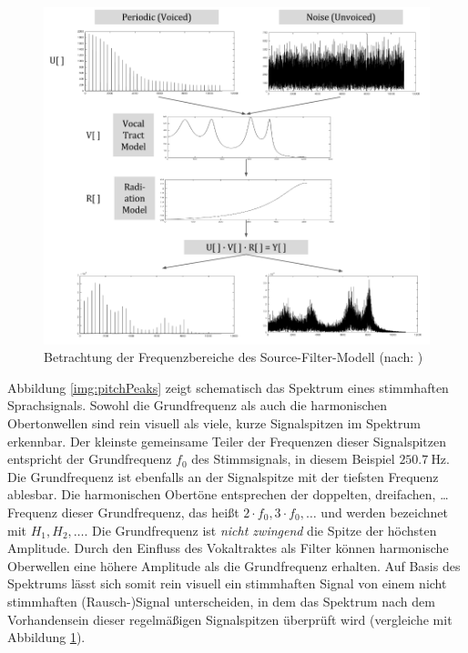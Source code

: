 \begin{figure}[H]
	\centering
	\includegraphics[width=1\textwidth]{bilder/sourceFilterSpectra.png}
	\caption[Betrachtung der Frequenzbereiche des Source-Filter-Modell]{Betrachtung der Frequenzbereiche des Source-Filter-Modell (nach: \cite[\emph{Source Estimation}, S. 3]{ricardo_ceps})}
	\label{img:sourceFilerSpectra}
\end{figure}	

Abbildung \ref{img:pitchPeaks} zeigt schematisch das Spektrum eines stimmhaften Sprachsignals. Sowohl die Grundfrequenz als auch die harmonischen Obertonwellen sind rein visuell als \glqq viele, kurze Signalspitzen\grqq{} im Spektrum erkennbar. Der kleinste gemeinsame Teiler der Frequenzen dieser Signalspitzen entspricht der Grundfrequenz $f_0$ des Stimmsignals, in diesem Beispiel $\SI{250.7}{\hertz}$. Die Grundfrequenz ist ebenfalls an der Signalspitze mit der tiefsten Frequenz ablesbar. Die harmonischen Obertöne entsprechen der doppelten, dreifachen, \ldots Frequenz dieser Grundfrequenz, das heißt $2\cdot f_0, 3\cdot f_0, \ldots$ und werden bezeichnet mit $H_1, H_2, \ldots$. Die Grundfrequenz ist \emph{nicht zwingend} die Spitze der höchsten Amplitude. Durch den Einfluss des Vokaltraktes als Filter können harmonische Oberwellen eine höhere Amplitude als die Grundfrequenz erhalten. Auf Basis des Spektrums lässt sich somit rein visuell ein stimmhaften Signal von einem nicht stimmhaften (Rausch-)Signal unterscheiden, in dem das Spektrum nach dem Vorhandensein dieser regelmäßigen Signalspitzen überprüft wird (vergleiche mit Abbildung \ref{img:sourceFilerSpectra}).\cite[S. 52 - 53]{sprachverarbeitung}


